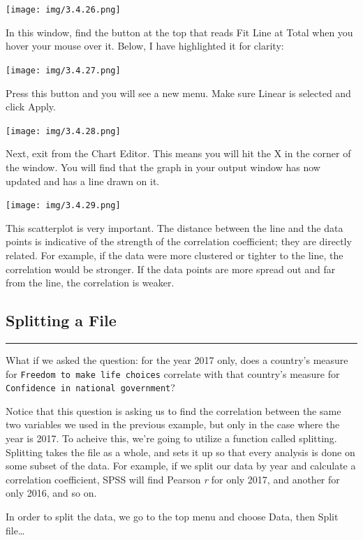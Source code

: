 \documentclass[]{book}
\begin{document}
\texttt{[image: img/3.4.26.png]}

In this window, find the button at the top that reads {Fit Line at
Total} when you hover your mouse over it. Below, I have highlighted it
for clarity:

\texttt{[image: img/3.4.27.png]}

Press this button and you will see a new menu. Make sure {Linear} is
selected and click {Apply}.

\texttt{[image: img/3.4.28.png]}

Next, exit from the Chart Editor. This means you will hit the {X} in the
corner of the window. You will find that the graph in your output window
has now updated and has a line drawn on it.

\texttt{[image: img/3.4.29.png]}

This scatterplot is very important. The distance between the line and
the data points is indicative of the strength of the correlation
coefficient; they are directly related. For example, if the data were
more clustered or tighter to the line, the correlation would be
stronger. If the data points are more spread out and far from the line,
the correlation is weaker.

\subsection{Splitting a File}\label{splitting-a-file}

\begin{center}\rule{0.5\linewidth}{0.5pt}\end{center}

What if we asked the question: for the year 2017 only, does a country's
measure for \texttt{Freedom\ to\ make\ life\ choices} correlate with
that country's measure for
\texttt{Confidence\ in\ national\ government}?

Notice that this question is asking us to find the correlation between
the same two variables we used in the previous example, but only in the
case where the year is 2017. To acheive this, we're going to utilize a
function called splitting. Splitting takes the file as a whole, and sets
it up so that every analysis is done on some subset of the data. For
example, if we split our data by year and calculate a correlation
coefficient, SPSS will find Pearson \emph{r} for only 2017, and another
for only 2016, and so on.

In order to split the data, we go to the top menu and choose {Data},
then {Split file\ldots{}}
\end{document}
